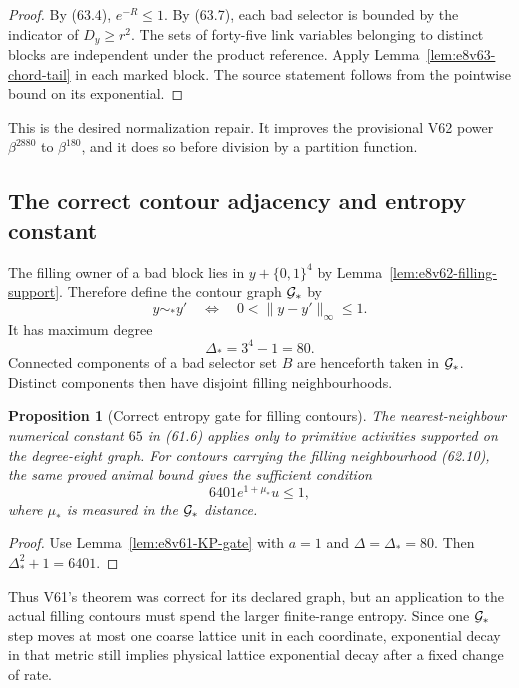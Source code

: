 \documentclass[11pt,oneside]{book}
\newtheorem{proposition}[theorem]{Proposition}
\theoremstyle{definition}
\theoremstyle{remark}
\begin{document}
\begin{proof}
By (63.4), \(e^{-R}\le1\).  By (63.7), each bad selector is
bounded by the indicator of \(D_y\ge r^2\).  The sets of forty-five
link variables belonging to distinct blocks are independent under
the product reference.  Apply Lemma~\ref{lem:e8v63-chord-tail} in
each marked block.  The source statement follows from the pointwise
bound on its exponential.
\end{proof}

This is the desired normalization repair.  It improves the
provisional V62 power \(\beta^{2880}\) to \(\beta^{180}\), and it
does so before division by a partition function.

\subsection{The correct contour adjacency and entropy constant}

The filling owner of a bad block lies in
\(y+\{0,1\}^4\) by Lemma~\ref{lem:e8v62-filling-support}.
Therefore define the contour graph \({\cal G}_*\) by
\[
 y\sim_*y'\quad\Longleftrightarrow\quad
 0<\|y-y'\|_\infty\le1.                                    \tag{63.13}
\]
It has maximum degree
\[
                         \Delta_*=3^4-1=80.                  \tag{63.14}
\]
Connected components of a bad selector set \(B\) are henceforth
taken in \({\cal G}_*\).  Distinct components then have disjoint
filling neighbourhoods.

\begin{proposition}[Correct entropy gate for filling contours]
\label{prop:e8v63-contour-entropy}
The nearest-neighbour numerical constant \(65\) in (61.6) applies
only to primitive activities supported on the degree-eight graph.
For contours carrying the filling neighbourhood (62.10), the same
proved animal bound gives the sufficient condition
\[
 \boxed{6401e^{1+\mu_*}u\le1,}                               \tag{63.15}
\]
where \(\mu_*\) is measured in the \({\cal G}_*\) distance.
\end{proposition}

\begin{proof}
Use Lemma~\ref{lem:e8v61-KP-gate} with \(a=1\) and
\(\Delta=\Delta_*=80\).  Then \(\Delta_*^2+1=6401\).
\end{proof}

Thus V61's theorem was correct for its declared graph, but an
application to the actual filling contours must spend the larger
finite-range entropy.  Since one \({\cal G}_*\) step moves at most
one coarse lattice unit in each coordinate, exponential decay in
that metric still implies physical lattice exponential decay after
a fixed change of rate.
\end{document}
